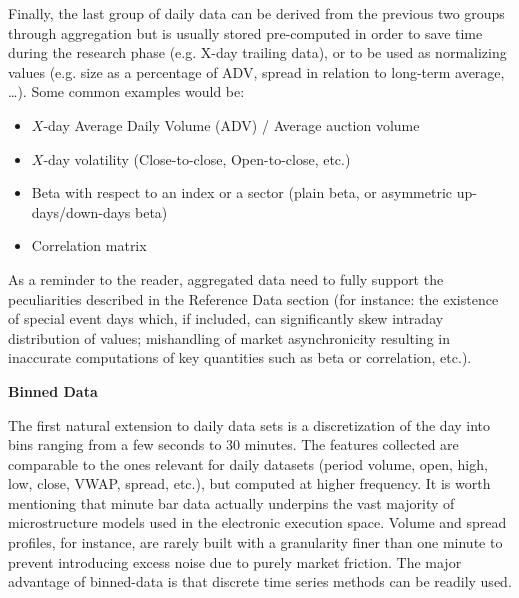 Finally, the last group of daily data can be derived from the previous two groups through aggregation but is usually stored pre-computed in order to save time during the research phase (e.g. X-day trailing data), or to be used as normalizing values (e.g. size as a percentage of ADV, spread in relation to long-term average, \dots). Some common examples would be:
        \begin{itemize}
        \item $X$-day Average Daily Volume (ADV) / Average auction volume
        \item $X$-day volatility (Close-to-close, Open-to-close, etc.)
        \item Beta with respect to an index or a sector (plain beta, or asymmetric up-days/down-days beta)
        \item Correlation matrix
        \end{itemize}


As a reminder to the reader, aggregated data need to fully support the peculiarities described in the Reference Data section (for instance: the existence of special event days which, if included, can significantly skew intraday distribution of values; mishandling of market asynchronicity resulting in inaccurate computations of key quantities such as beta or correlation, etc.).\twomedskip


\noindent\textbf{Binned Data}\label{in:binned_data}\twomedskip

The first natural extension to daily data sets is a discretization of the day into bins ranging from a few seconds to 30 minutes. The features collected are comparable to the ones relevant for daily datasets (period volume, open, high, low, close, VWAP, spread, etc.), but computed at higher frequency. It is worth mentioning that minute bar data actually underpins the vast majority of microstructure models used in the electronic execution space. Volume and spread profiles, for instance, are rarely built with a granularity finer than one minute to prevent introducing excess noise due to purely market friction. The major advantage of binned-data is that discrete time series methods can be readily used.


